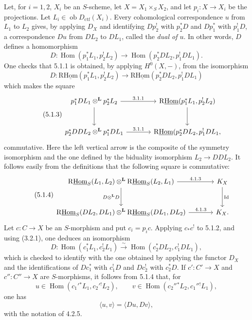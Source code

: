 \documentclass[11pt]{article}
\DeclareMathOperator{\Hom}{Hom}
\providecommand{\Hom}{\operatorname{Hom}}
\providecommand{\Hom}{\operatorname{Hom}}
\begin{document}
Let, for $i=1,2$, $X_i$ be an $S$-scheme, let $X=X_1\times_S X_2$, and let $p_i:X\to X_i$ be the projections. Let $L_i\in\operatorname{ob}D_{\mathrm{ctf}}(X_i)$. Every cohomological correspondence $u$ from $L_1$ to $L_2$ gives, by applying $D_X$ and identifying $Dp_2^!$ with $p_2^*D$ and $Dp_1^*$ with $p_1^!D$, a correspondence $Du$ from $DL_2$ to $DL_1$, called the \emph{dual of $u$}. In other words, $D$ defines a homomorphism
\begin{equation}
\tag{5.1.1}
D:\Hom(p_1^*L_1,p_2^!L_2)\longrightarrow \Hom(p_2^*DL_2,p_1^!DL_1).
\end{equation}
One checks that 5.1.1 is obtained, by applying $H^0(X,-)$, from the isomorphism
\begin{equation}
\tag{5.1.2}
D:\mathrm{R}\underline{\mathrm{Hom}}(p_1^*L_1,p_2^!L_2)\longrightarrow\mathrm{R}\underline{\mathrm{Hom}}(p_2^*DL_2,p_1^!DL_1)
\end{equation}
which makes the square
\begin{equation}
\tag{5.1.3}
\begin{tikzcd}[column sep=large,row sep=large]
p_1^*DL_1\otimes^{\mathbf L}p_2^*L_2 \arrow[r,"3.1.1"] \arrow[d]
& \mathrm{R}\underline{\mathrm{Hom}}(p_1^*L_1,p_2^!L_2) \arrow[d] \\
p_2^*DDL_2\otimes^{\mathbf L}p_1^*DL_1 \arrow[r,"3.1.1"]
& \mathrm{R}\underline{\mathrm{Hom}}(p_2^*DL_2,p_1^!DL_1,
\end{tikzcd}
\end{equation}
commutative. Here the left vertical arrow is the composite of the symmetry isomorphism and the one defined by the biduality isomorphism $L_2\to DDL_2$. It follows easily from the definitions that the following square is commutative:
\begin{equation}
\tag{5.1.4}
\begin{tikzcd}[column sep=large,row sep=large]
\mathrm{R}\underline{\mathrm{Hom}}_S(L_1,L_2)\otimes^{\mathbf L}\mathrm{R}\underline{\mathrm{Hom}}_S(L_2,L_1) \arrow[r,"4.1.3"] \arrow[d,"D\otimes^{\mathbf L} D"']
& K_X \arrow[d,"\operatorname{Id}"] \\
\mathrm{R}\underline{\mathrm{Hom}}_S(DL_2,DL_1)\otimes^{\mathbf L}\mathrm{R}\underline{\mathrm{Hom}}_S(DL_1,DL_2) \arrow[r,"4.1.3"]
& K_X.
\end{tikzcd}
\end{equation}
Let $c:C\to X$ be an $S$-morphism and put $c_i=p_ic$. Applying $c_*c^!$ to 5.1.2, and using (3.2.1), one deduces an isomorphism
\begin{equation}
\tag{5.1.5}
D:\Hom(c_1^*L_1,c_2^!L_1)\xrightarrow{\sim}\Hom(c_2^*DL_2,c_1^!DL_1),
\end{equation}
which is checked to identify with the one obtained by applying the functor $D_X$ and the identifications of $Dc_1^*$ with $c_1^!D$ and $Dc_2^!$ with $c_2^*D$. If $c':C'\to X$ and $c'':C''\to X$ are $S$-morphisms, it follows from 5.1.4 that, for
\[
u\in\Hom(c_1'{}^*L_1,c_2'{}^!L_2),\qquad v\in\Hom(c_2''{}^*L_2,c_1''{}^!L_1),\]
one has
\begin{equation}
\tag{5.1.6}
\langle u,v\rangle=\langle Du,Dv\rangle,
\end{equation}
with the notation of 4.2.5.
\end{document}
